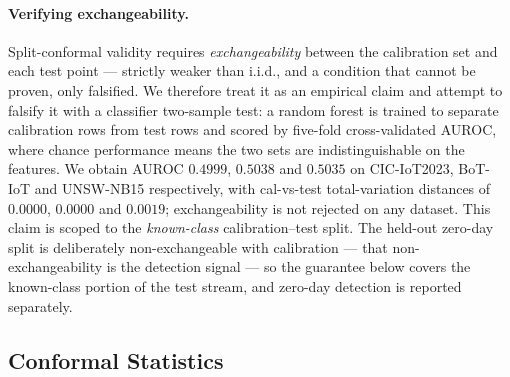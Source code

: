 \paragraph{Verifying exchangeability.}
Split-conformal validity requires \emph{exchangeability} between the calibration set and each test point ---
strictly weaker than i.i.d., and a condition that cannot be proven, only falsified. We therefore treat it as
an empirical claim and attempt to falsify it with a classifier two-sample test: a random forest is trained
to separate calibration rows from test rows and scored by five-fold cross-validated AUROC, where chance
performance means the two sets are indistinguishable on the features. We obtain AUROC $0.4999$, $0.5038$ and
$0.5035$ on CIC-IoT2023, BoT-IoT and UNSW-NB15 respectively, with cal-vs-test total-variation distances of
$0.0000$, $0.0000$ and $0.0019$; exchangeability is not rejected on any dataset. This claim is scoped to the
\emph{known-class} calibration--test split. The held-out zero-day split is deliberately non-exchangeable
with calibration --- that non-exchangeability is the detection signal --- so the guarantee below covers the
known-class portion of the test stream, and zero-day detection is reported separately.

\subsection{Conformal Statistics}
\label{sec:methods-conformal}

